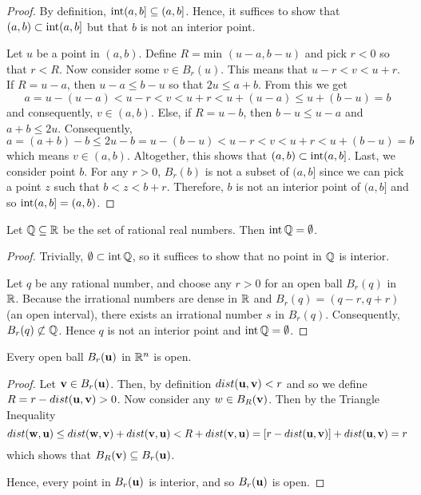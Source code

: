 \documentclass[letterpaper, twoside, 12pt]{book}
\begin{document}
\begin{proof}
    By definition, \(\operatorname{int}(a,b] \subseteq (a,b]\). Hence,
    it suffices to show that \((a,b) \subset \operatorname{int}(a,b]\) but that
    \(b\) is not an interior point.

    Let \(u\) be a point in \((a,b)\). Define 
    \(R = \text{min~}(u-a, b-u)\) and pick \(r < 0\) so that \(r < R\).
    Now consider some \(v \in B_r(u)\). This means that 
    \(u - r < v < u + r\). If \(R = u -a\), then \(u - a \leq b - u\)
    so that \(2u \leq a + b \). From this we get
    \[ a = u - (u - a) < u - r < v < u + r < u + (u - a) \leq u + (b - u) = b \]
    and consequently, \(v \in (a, b)\). Else, if \(R = u - b\), 
    then \(b - u \leq u - a\) and \(a + b \leq 2u\). Consequently,
    \[ a = (a + b) - b  \leq 2u - b = u - (b - u) < u - r < v < u + r < u + (b - u) = b \]
    which means \(v \in (a, b)\).
    Altogether, this shows that \((a, b) \subset \operatorname{int}(a,b]\). Last,
    we consider point \(b\). For any \(r > 0\), \(B_r(b)\) is not a subset
    of \((a,b]\) since we can pick a point \(z\) such that \(b < z < b + r\).
    Therefore, \(b\) is not an interior point of \((a,b]\) and so
    \(\operatorname{int}(a,b] = (a,b)\).
\end{proof}

\begin{example}[10.12]
  Let \(\mathbb Q\subseteq\mathbb R\) be the set of rational real numbers.
  Then \(\operatorname{int}\mathbb Q=\emptyset\).
\end{example}

\begin{proof}
    Trivially, \(\emptyset \subset \operatorname{int} \mathbb Q\), so it 
    suffices to show that no point in \(\mathbb Q\) is interior.

    Let \(q\) be any rational number, and choose any \(r > 0\)
    for an open ball \(B_r(q)\) in \(\mathbb R\). Because the irrational
    numbers are dense in \(\mathbb R\) and \(B_r(q) = (q - r, q + r)\)
    (an open interval), there exists an irrational number \(s\)
    in \(B_r(q)\). Consequently, \(B_r(q) \not\subset \mathbb Q\).
    Hence \(q\) is not an interior point and \(\operatorname{int} \mathbb Q = \emptyset\).
\end{proof}

\begin{proposition}[10.13]
  Every open ball \(B_r(\mathbf u)\) in \(\mathbb R^n\) is open.
\end{proposition}

\begin{proof}
    Let \(\mathbf v \in B_r(\mathbf u)\). Then, by definition
    \(dist(\mathbf u , \mathbf v) < r\) and so we define 
    \(R = r - dist(\mathbf u, \mathbf v) > 0 \). Now consider
    any \(w \in B_{R}(\mathbf v)\). Then by the Triangle
    Inequality
    \[ dist(\mathbf w, \mathbf u) \leq dist(\mathbf w, \mathbf v) + dist(\mathbf v, \mathbf u)
        < R + dist(\mathbf v, \mathbf u) 
        = [r - dist(\mathbf u, \mathbf v)] + dist(\mathbf u, \mathbf v) 
    = r \]
    which shows that \(B_{R}(\mathbf v) \subseteq B_{r}(\mathbf u)\).

    Hence, every point in \(B_r(\mathbf u)\) is interior, and so
    \(B_r(\mathbf u)\) is open.
\end{proof}
\end{document}
